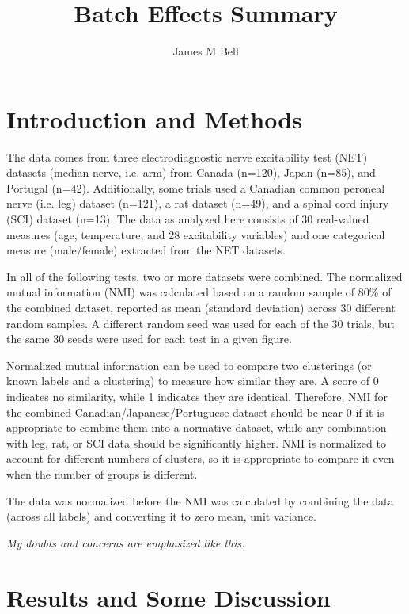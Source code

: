 \documentclass[12pt]{article}
\title{Batch Effects Summary}
\author{James M Bell}
\begin{document}
\maketitle

\section*{Introduction and Methods}

The data comes from three electrodiagnostic nerve excitability test (NET) datasets (median nerve, i.e. arm) from Canada (n=120), Japan (n=85), and Portugal (n=42). Additionally, some trials used a Canadian common peroneal nerve (i.e. leg) dataset (n=121), a rat dataset (n=49), and a spinal cord injury (SCI) dataset (n=13). The data as analyzed here consists of 30 real-valued measures (age, temperature, and 28 excitability variables) and one categorical measure (male/female) extracted from the NET datasets.


In all of the following tests, two or more datasets were combined. The normalized mutual information (NMI) was calculated based on a random sample of 80\% of the combined dataset, reported as mean (standard deviation) across 30 different random samples. A different random seed was used for each of the 30 trials, but the same 30 seeds were used for each test in a given figure.

Normalized mutual information can be used to compare two clusterings (or known labels and a clustering) to measure how similar they are. A score of 0 indicates no similarity, while 1 indicates they are identical. Therefore, NMI for the combined Canadian/Japanese/Portuguese dataset should be near 0 if it is appropriate to combine them into a normative dataset, while any combination with leg, rat, or SCI data should be significantly higher. NMI is normalized to account for different numbers of clusters, so it is appropriate to compare it even when the number of groups is different.

The data was normalized before the NMI was calculated by combining the data (across all labels) and converting it to zero mean, unit variance.

\emph{My doubts and concerns are emphasized like this.}

\pagebreak

\section*{Results and Some Discussion}
\end{document}
